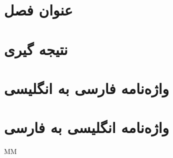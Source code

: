 \documentclass[12pt]{report}
\begin{document}
	\chapter{عنوان فصل}
	
	\chapter{نتیجه گیری}
	
	\chapter*{واژه‌نامه فارسی به انگلیسی}
	\chapter*{ واژه‌نامه انگلیسی به فارسی}
	
	\begin{thebibliography}{MM}
	\end{thebibliography}
	
\end{document}
